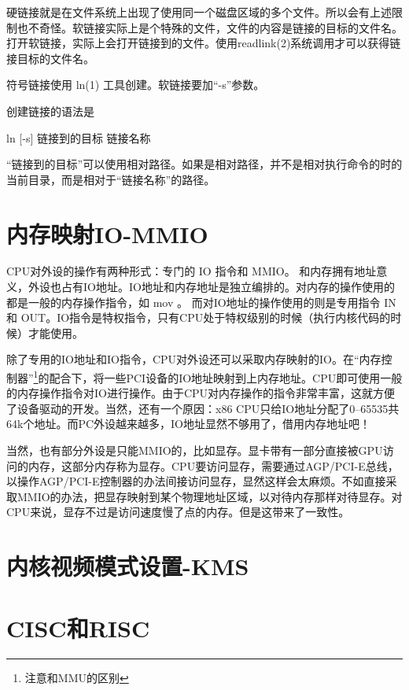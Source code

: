 硬链接就是在文件系统上出现了使用同一个磁盘区域的多个文件。所以会有上述限制也不奇怪。软链接实际上是个特殊的文件，文件的内容是链接的目标的文件名。打开软链接，实际上会打开链接到的文件。使用readlink(2)系统调用才可以获得链接目标的文件名。

符号链接使用 ln(1) 工具创建。软链接要加“-s”参数。

创建链接的语法是

\begin{code}
ln [-s] 链接到的目标 链接名称
\end{code}


“链接到的目标”可以使用相对路径。如果是相对路径，并不是相对执行命令的时的当前目录，而是相对于“链接名称”的路径。

\section{内存映射IO-MMIO}\label{FAQ:MMIO}

CPU对外设的操作有两种形式：专门的 IO 指令和 MMIO。 和内存拥有地址意义，外设也占有IO地址。IO地址和内存地址是独立编排的。对内存的操作使用的都是一般的内存操作指令，如 mov 。
而对IO地址的操作使用的则是专用指令 IN 和 OUT。IO指令是特权指令，只有CPU处于特权级别的时候（执行内核代码的时候）才能使用。

除了专用的IO地址和IO指令，CPU对外设还可以采取内存映射的IO。在“内存控制器”\footnote{注意和MMU的区别}的配合下，将一些PCI设备的IO地址映射到上内存地址。CPU即可使用一般的内存操作指令对IO进行操作。由于CPU对内存操作的指令非常丰富，这就方便了设备驱动的开发。当然，还有一个原因：x86 CPU只给IO地址分配了0--65535共64k个地址。而PC外设越来越多，IO地址显然不够用了，借用内存地址吧！

当然，也有部分外设是只能MMIO的，比如显存。显卡带有一部分直接被GPU访问的内存，这部分内存称为显存。CPU要访问显存，需要通过AGP/PCI-E总线，以操作AGP/PCI-E控制器的办法间接访问显存，显然这样会太麻烦。不如直接采取MMIO的办法，把显存映射到某个物理地址区域，以对待内存那样对待显存。对CPU来说，显存不过是访问速度慢了点的内存。但是这带来了一致性。

\section{内核视频模式设置-KMS}\label{FAQ:KMS}

\section{CISC和RISC}\label{FAQ:CISCandRISC}


